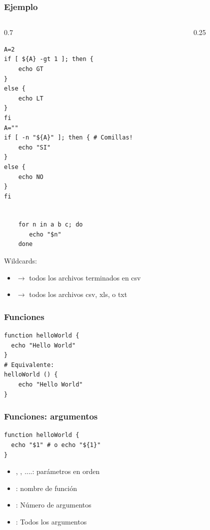 \documentclass[14pt,aspectratio=169,xcolor=dvipsnames]{beamer}
\begin{document}
\begin{frame}[fragile]\frametitle{Ejemplo}
    \begin{footnotesize}
    \begin{columns}
        \begin{column}{0.7\textwidth}
            \begin{verbatim}
A=2
if [ ${A} -gt 1 ]; then {
    echo GT
}
else {
    echo LT
}
fi
A=""
if [ -n "${A}" ]; then { # Comillas!
    echo "SI"
}
else {
    echo NO
}
fi

            \end{verbatim}
        \end{column}
        \begin{column}{0.25\textwidth}
        \end{column}
    \end{columns}
    \end{footnotesize}
\end{frame}
\begin{frame}[fragile]\frametitle{}
    \begin{verbatim}
    for n in a b c; do
       echo "$n"
    done
    \end{verbatim}
    Wildcards:
    \begin{itemize}
        \item {} $\to$ todos los archivos terminados en csv
        \item {} $\to$ todos los archivos csv, xls, o txt
    \end{itemize}

\end{frame}
\begin{frame}[fragile]\frametitle{Funciones}
    \begin{verbatim}
function helloWorld {
  echo "Hello World"
}
# Equivalente: 
helloWorld () {
    echo "Hello World"
}
    \end{verbatim}
\end{frame}
\begin{frame}[fragile]\frametitle{Funciones: argumentos}
    \begin{verbatim}
function helloWorld {
  echo "$1" # o echo "${1}"
}
    \end{verbatim}
    \begin{itemize}
        \item {}, , ....: parámetros en orden
        \item {}: nombre de función
        \item \code{\$\#}: Número de argumentos   
        \item {}: Todos los argumentos
    \end{itemize}
\end{frame}
\end{document}
